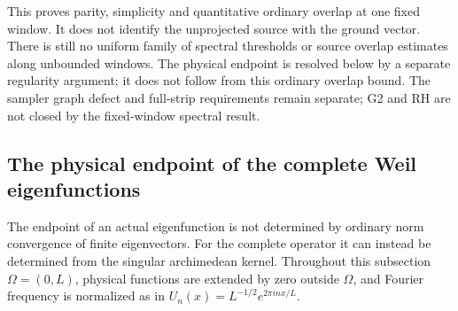 \documentclass[11pt]{article}
\theoremstyle{remark}
\begin{document}
This proves parity, simplicity and quantitative ordinary overlap at one
fixed window. It does not identify the unprojected source with the
ground vector. There is still no uniform family of spectral thresholds
or source overlap estimates along unbounded windows. The physical
endpoint is resolved below by a separate regularity argument; it does
not follow from this ordinary overlap bound. The sampler graph defect
and full-strip requirements remain separate; G2 and RH are not closed
by the fixed-window spectral result.

\subsection*{The physical endpoint of the complete Weil eigenfunctions}

The endpoint of an actual eigenfunction is not determined by ordinary
norm convergence of finite eigenvectors.  For the complete operator it
can instead be determined from the singular archimedean kernel.
Throughout this subsection $\Omega=(0,L)$, physical functions are
extended by zero outside $\Omega$, and Fourier frequency is normalized
as in $U_n(x)=L^{-1/2}e^{2\pi inx/L}$.
\end{document}
